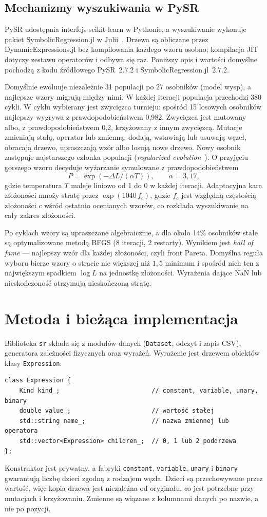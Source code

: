 \documentclass[11pt,a4paper]{article}
\begin{document}
\subsection{Mechanizmy wyszukiwania w PySR}
PySR udostępnia interfejs scikit-learn w Pythonie, a wyszukiwanie wykonuje
pakiet SymbolicRegression.jl w Julii~\cite{cranmer,pysr}. Drzewa są obliczane
przez DynamicExpressions.jl bez kompilowania każdego wzoru osobno; kompilacja
JIT dotyczy zestawu operatorów i odbywa się raz. Poniższy opis i wartości
domyślne pochodzą z kodu źródłowego PySR~2.7.2 i SymbolicRegression.jl~2.7.2.

Domyślnie ewoluuje niezależnie 31 populacji po 27 osobników (model wysp),
a najlepsze wzory migrują między nimi. W każdej iteracji populacja przechodzi
380 cykli. W cyklu wybierany jest zwycięzca turnieju: spośród 15 losowych
osobników najlepszy wygrywa z prawdopodobieństwem 0,982. Zwycięzca jest
mutowany albo, z prawdopodobieństwem 0,2, krzyżowany z innym zwycięzcą.
Mutacje zmieniają stałą, operator lub zmienną, dodają, wstawiają lub usuwają
węzeł, obracają drzewo, upraszczają wzór albo losują nowe drzewo.
Nowy osobnik zastępuje najstarszego członka populacji (\emph{regularized
evolution}~\cite{real}). O przyjęciu gorszego wzoru decyduje wyżarzanie
symulowane z prawdopodobieństwem
\[
P = \exp(-\Delta L/(\alpha T)),\qquad \alpha = 3{,}17,
\]
gdzie temperatura $T$ maleje liniowo od 1 do 0 w każdej iteracji.
Adaptacyjna kara złożoności mnoży stratę przez $\exp(1040\,f_c)$, gdzie $f_c$
jest względną częstością złożoności $c$ wśród ostatnio ocenianych wzorów,
co rozkłada wyszukiwanie na cały zakres złożoności.

Po cyklach wzory są upraszczane algebraicznie, a dla około 14\% osobników
stałe są optymalizowane metodą BFGS (8 iteracji, 2 restarty). Wynikiem jest
\emph{hall of fame} --- najlepszy wzór dla każdej złożoności, czyli front
Pareta. Domyślna reguła wyboru bierze wzory o stracie nie większej niż
$1{,}5$ minimum i spośród nich ten z największym spadkiem $\log L$ na
jednostkę złożoności. Wyrażenia dające NaN lub nieskończoność otrzymują
nieskończoną stratę.

\section{Metoda i bieżąca implementacja}
Biblioteka \texttt{sr} składa się z modułów danych (\texttt{Dataset}, odczyt
i zapis CSV), generatora zależności fizycznych oraz wyrażeń. Wyrażenie jest
drzewem obiektów klasy \texttt{Expression}:
\begin{verbatim}
class Expression {
    Kind kind_;                         // constant, variable, unary, binary
    double value_;                      // wartość stałej
    std::string name_;                  // nazwa zmiennej lub operatora
    std::vector<Expression> children_;  // 0, 1 lub 2 poddrzewa
};
\end{verbatim}
Konstruktor jest prywatny, a fabryki \texttt{constant}, \texttt{variable},
\texttt{unary} i \texttt{binary} gwarantują liczbę dzieci zgodną z rodzajem
węzła. Dzieci są przechowywane przez wartość, więc kopia drzewa jest niezależna
od oryginału, co jest potrzebne przy mutacjach i krzyżowaniu. Zmienne są
wiązane z kolumnami danych po nazwie, a nie po pozycji.
\end{document}
